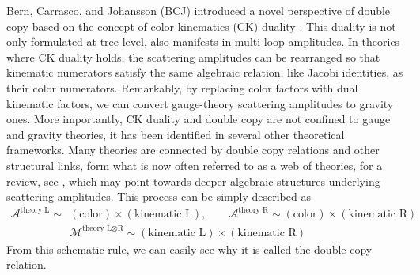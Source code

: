\documentclass[a4paper,11pt]{article}
\begin{document}
Bern, Carrasco, and Johansson (BCJ) introduced a novel perspective of double copy based on the concept of color-kinematics (CK) duality \cite{Bern:2008qj,Bern:2010ue}.
This duality is not only formulated at tree level, also manifests in multi-loop amplitudes.
In theories where CK duality holds, the scattering amplitudes can be rearranged so that kinematic numerators satisfy the same algebraic relation, like Jacobi identities, 
as their color numerators. Remarkably, by replacing color factors with dual kinematic factors, we can convert gauge-theory scattering amplitudes to gravity ones. 
More importantly, CK duality and double copy are not confined to gauge and gravity theories, 
it has been identified in several other theoretical frameworks. Many theories are connected by double copy relations and other structural links, 
form what is now often referred to as a web of theories,
for a review, see \cite{Bern:2019prr,Bern:2022wqg,Adamo:2022dcm}, which may point towards deeper algebraic structures underlying scattering amplitudes.
This process can be simply described as
\begin{equation}
    \begin{split}
    \mathcal{A}^{\text{theory L}}\sim& (\text{color})\times (\text{kinematic L}),\qquad \mathcal{A}^{\text{theory R}}\sim (\text{color})\times (\text{kinematic R})\\
        &\mathcal{M}^{\text{theory L}\otimes\text{R}}\sim (\text{kinematic L})\times (\text{kinematic R})
    \end{split}
\end{equation}
From this schematic rule, we can easily see why it is called the double copy relation.\par
\end{document}

